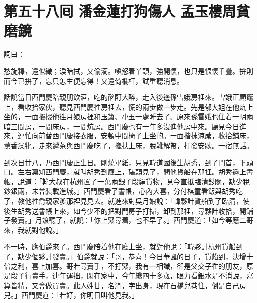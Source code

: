 
\chapter*{第五十八囘 潘金蓮打狗傷人 孟玉樓周貧磨鏡}


詞曰：

\begin{myquote} 
愁旋釋，還似織；淚暗拭，又偷滴。嗔怒着丫頭，強開懷，也只是恨懷千疊。拚則而今已拚了，忘只怎生便忘得！又還倚欄杆，試重聽消息。

\end{myquote} 

話說當日西門慶陪親朋飲酒，吃的酩酊大醉，走入後邊孫雪娥房裡來。雪娥正顧竈上，看收拾家伙，聽見西門慶徃房裡去，慌的兩步做一步走。{}先是郁大姐在他炕上坐的，一面攛掇他徃月娘房裡和玉簫、小玉一處睡去了。原來孫雪娥也住着一明兩暗三間房，一間床房，一間炕房。西門慶也有一年多沒進他房中來。聽見今日進來，連忙向前替西門慶接衣服，安頓中間椅子上坐的。一面揩抹涼蓆，收拾鋪床，薰香澡牝，走來遞茶與西門慶吃了，攙扶上床，脫靴解帶，打發安歇。一宿無話。

到次日廿八，乃西門慶正生日。剛燒畢紙，只見韓道國後生胡秀，到了門首，下頭口。左右稟知西門慶，就叫胡秀到廳上，磕頭見了，問他貨船在那裡。胡秀遞上書帳，說道：「韓大叔在杭州置了一萬兩銀子段絹貨物，見今直抵臨清鈔關，缺少稅鈔銀兩，未曾裝載進城。」西門慶看了書帳，心內大喜，分付棋童看飯與胡秀吃了，教他徃喬親家爹那裡見見去。就進來對吳月娘說：「韓夥計貨船到了臨清，使後生胡秀送書帳上來，如今少不的把對門房子打掃，卸到那裡，尋夥計收拾，開鋪子發賣。」月娘聽了，就說：「你上緊尋着，也不早了。」西門慶道：「如今等應二哥來，我就對他說。」

不一時，應伯爵來了。西門慶陪着他在廳上坐，就對他說：「韓夥計杭州貨船到了，缺少個夥計發賣。」伯爵就說：「哥，恭喜！今日華誕的日子，貨船到，決增十倍之利，喜上加喜。{}哥若尋賣手，不打緊，我有一相識，卻是父交子徃的朋友，原是段子行賣手，連年運拙，閑在家中，今年纔四十多歲，眼力看銀水是不消說，寫算皆精，又會做買賣。此人姓甘，名潤，字出身，現在石橋兒巷住，倒是自己房兒。」西門慶道：「若好，你明日叫他見我。」

